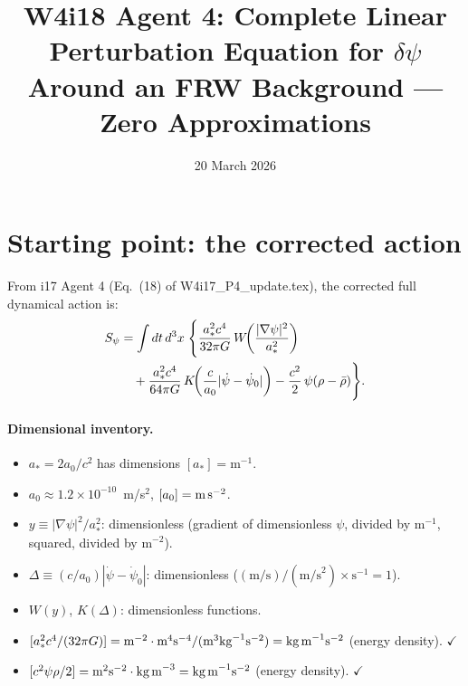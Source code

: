 \documentclass[aps,prd,twocolumn,nofootinbib]{revtex4-2}
\newcommand{\aM}{a_0}
\newcommand{\astar}{a_*}
\newcommand{\ee}[1]{\times 10^{#1}}
\begin{document}
\title{W4i18 Agent 4: Complete Linear Perturbation Equation for $\delta\psi$\\
Around an FRW Background --- Zero Approximations}
\date{20 March 2026}
\maketitle

\section{Starting point: the corrected action}
\label{sec:action}

From i17 Agent 4 (Eq.~(18) of W4i17\_P4\_update.tex), the corrected
full dynamical action is:
\begin{align}
S_\psi &= \int dt\,d^3x\;\Biggl\{
  \frac{\astar^2 c^4}{32\pi G}\,
    W\!\biggl(\frac{|\nabla\psi|^2}{\astar^2}\biggr)
  \notag\\
  &\quad+ \frac{\astar^2 c^4}{64\pi G}\,
    K\!\biggl(\frac{c}{\aM}|\dot\psi - \dot\psi_0|\biggr)
  - \frac{c^2}{2}\,\psi(\rho - \bar\rho)
\Biggr\}.
\label{eq:action-corrected}
\end{align}

\paragraph{Dimensional inventory.}
\begin{itemize}
\item $\astar = 2\aM/c^2$ has dimensions $[\astar] = \text{m}^{-1}$.
\item $\aM \approx 1.2\ee{-10}$~m/s$^2$, $[\aM] = \text{m\,s}^{-2}$.
\item $y \equiv |\nabla\psi|^2/\astar^2$: dimensionless (gradient of
  dimensionless $\psi$, divided by $\text{m}^{-1}$, squared, divided
  by $\text{m}^{-2}$).
\item $\Delta \equiv (c/\aM)|\dot\psi - \dot\psi_0|$: dimensionless
  ($(\text{m/s})/(\text{m/s}^2) \times \text{s}^{-1} = 1$).
\item $W(y)$, $K(\Delta)$: dimensionless functions.
\item $[\astar^2 c^4/(32\pi G)] = \text{m}^{-2}\cdot\text{m}^4\text{s}^{-4}
  /(\text{m}^3\text{kg}^{-1}\text{s}^{-2})
  = \text{kg\,m}^{-1}\text{s}^{-2}$ (energy density). $\checkmark$
\item $[c^2\psi\rho/2] = \text{m}^2\text{s}^{-2}\cdot\text{kg\,m}^{-3}
  = \text{kg\,m}^{-1}\text{s}^{-2}$ (energy density). $\checkmark$
\end{itemize}
\end{document}
